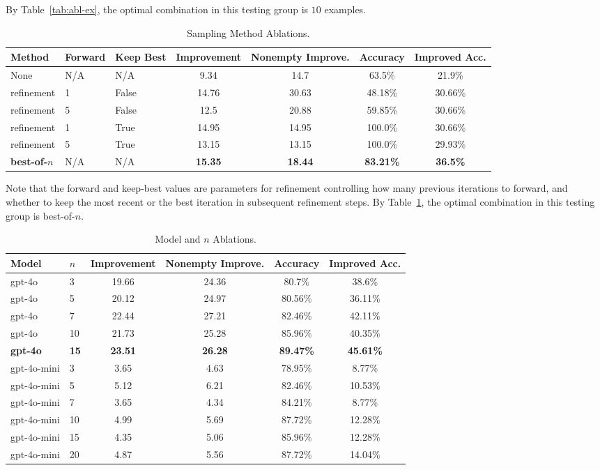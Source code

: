 By Table~\ref{tab:abl-ex}, the optimal combination in this testing group is $10$ examples.

\begin{table}[h]
\caption{Sampling Method Ablations.}
\label{tab:abl-samp}
\centering
\small
\begin{tabular}{lll|cccc}
\toprule
Method & Forward & Keep Best & Improvement & Nonempty Improve. & Accuracy & Improved Acc.\\
\midrule
None & N/A & N/A & 9.34 & 14.7 & 63.5\% & 21.9\% \\
refinement & 1 & False & 14.76 & 30.63 & 48.18\% & 30.66\% \\
refinement & 5 & False & 12.5 & 20.88 & 59.85\% & 30.66\% \\
refinement & 1 & True & 14.95 & 14.95 & 100.0\% & 30.66\% \\
refinement & 5 & True & 13.15 & 13.15 & 100.0\% & 29.93\% \\
\textbf{best-of-$n$} & N/A & N/A & \textbf{15.35} & \textbf{18.44} & \textbf{83.21\%} & \textbf{36.5\%} \\
\bottomrule
\end{tabular}
\end{table}

Note that the forward and keep-best values are parameters for refinement controlling how many previous iterations to forward, and whether to keep the most recent or the best iteration in subsequent refinement steps. By Table~\ref{tab:abl-samp}, the optimal combination in this testing group is best-of-$n$.

\begin{table}[h]
\caption{Model and $n$ Ablations.}
\label{tab:abl-n}
\centering
\small
\begin{tabular}{ll|cccc}
\toprule
Model & $n$ & Improvement & Nonempty Improve. & Accuracy & Improved Acc.\\
\midrule
gpt-4o & 3 & 19.66 & 24.36 & 80.7\% & 38.6\% \\
gpt-4o & 5 & 20.12 & 24.97 & 80.56\% & 36.11\% \\
gpt-4o & 7 & 22.44 & 27.21 & 82.46\% & 42.11\% \\
gpt-4o & 10 & 21.73 & 25.28 & 85.96\% & 40.35\% \\
\textbf{gpt-4o} & \textbf{15} & \textbf{23.51} & \textbf{26.28} & \textbf{89.47\%} & \textbf{45.61\%} \\
gpt-4o-mini & 3 & 3.65 & 4.63 & 78.95\% & 8.77\% \\
gpt-4o-mini & 5 & 5.12 & 6.21 & 82.46\% & 10.53\% \\
gpt-4o-mini & 7 & 3.65 & 4.34 & 84.21\% & 8.77\% \\
gpt-4o-mini & 10 & 4.99 & 5.69 & 87.72\% & 12.28\% \\
gpt-4o-mini & 15 & 4.35 & 5.06 & 85.96\% & 12.28\% \\
gpt-4o-mini & 20 & 4.87 & 5.56 & 87.72\% & 14.04\% \\
\bottomrule
\end{tabular}
\end{table}

